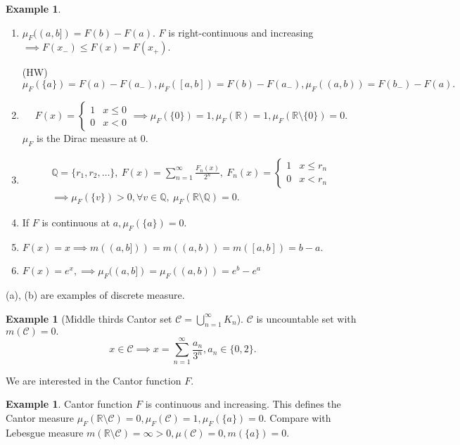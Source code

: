 \documentclass{report}
\newcommand{\R}{\mathbb{R}}
\newcommand{\Q}{\mathbb{Q}}
\theoremstyle{definition}
\newtheorem{example}[theorem]{Example}
\theoremstyle{remark}
\newcommand{\fnl}{\parbox[t]{0\linewidth}{}}
\begin{document}
\begin{example}
\begin{enumerate}
\item $\mu_F((a, b]) = F(b) - F(a)$. $F$ is right-continuous and increasing $\implies F(x_-) \leq F(x) = F(x_+)$.

(HW) $\mu_F(\{a\}) = F(a) - F(a_-), \mu_F([a, b]) = F(b) - F(a_-), \mu_F((a, b)) = F(b_-) - F(a).$

\item
\[F(x) = \begin{cases}
1 & x \leq 0 \\ 0 & x < 0
\end{cases} \implies \mu_F(\{0\}) = 1, \mu_F(\R) = 1, \mu_F(\R \setminus \{0\}) = 0.
\]
$\mu_F$ is the Dirac measure at $0$.

\item
\begin{multline*}
\Q = \{r_1, r_2, \ldots\},\ F(x) = \sum_{n=1}^\infty \frac{F_n(x)}{2^n},\ F_n(x) = \begin{cases}
1 & x \leq r_n \\ 0 & x < r_n
\end{cases} \\
\implies \mu_F(\{v\}) > 0, \forall v \in \Q,\ \mu_F(\R \setminus \Q) = 0.
\end{multline*}

\item 
If $F$ is continuous at $a, \mu_F(\{a\}) = 0$.

\item
$F(x) = x \implies m((a, b])) = m((a, b)) = m([a, b]) = b - a.$

\item
$F(x) = e^x, \implies \mu_F((a, b]) = \mu_F((a, b)) = e^b - e^a$
\end{enumerate}
(a), (b) are examples of discrete measure.
\end{example}

\begin{example}
[Middle thirds Cantor set $\mathcal{C} = \bigcup_{n=1}^\infty K_n$]\fnl

$\mathcal{C}$ is uncountable set with $m(\mathcal{C}) = 0.$
\[x \in \mathcal{C} \implies x = \sum_{n=1}^\infty \frac{a_n}{3^n}, a_n \in \{0, 2\}.\]

We are interested in the Cantor function $F$.
\end{example}

\begin{example}
Cantor function $F$ is continuous and increasing.
This defines the Cantor measure $\mu_F(\R \setminus \mathcal{C}) = 0, \mu_F(\mathcal{C}) = 1, \mu_F(\{a\}) = 0.$ Compare with Lebesgue measure $m(\R \setminus \mathcal{C}) = \infty > 0, \mu(\mathcal{C}) = 0, m(\{a\}) = 0$.
\end{example}
\end{document}
